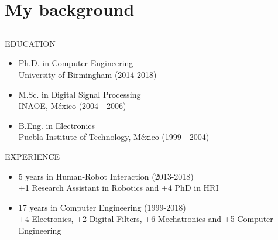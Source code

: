\section{My background}

\small 

\subsection{}
{
\begin{frame}{}


EDUCATION
\begin{itemize}	
	\item Ph.D. in Computer Engineering \\
	University of Birmingham (2014-2018)
	\item M.Sc. in Digital Signal Processing \\
	INAOE, M\'exico (2004 - 2006)
	\item B.Eng. in Electronics \\
	Puebla Institute of Technology, M\'exico (1999 - 2004)
\end{itemize}

EXPERIENCE 

\begin{itemize}
	\item 5 years in Human-Robot Interaction (2013-2018) \\
		+1 Research Assistant in Robotics and +4 PhD in HRI
	\item 17 years in Computer Engineering (1999-2018) \\
		+4 Electronics, +2 Digital Filters, +6 Mechatronics and +5 Computer Engineering
		
\end{itemize}


\end{frame}
}



\subsection{}
{
\begin{frame}{}


    \begin{figure}
   \end{figure}



\end{frame}
}



